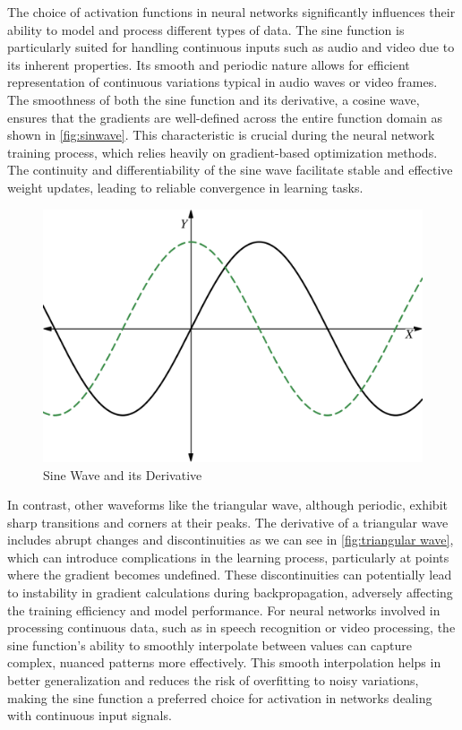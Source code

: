 \documentclass{ioereport}
\begin{document}
    The choice of activation functions in neural networks significantly influences their ability to model and process different types of data. The sine function is particularly suited for handling continuous inputs such as audio and video due to its inherent properties. Its smooth and periodic nature allows for efficient representation of continuous variations typical in audio waves or video frames. The smoothness of both the sine function and its derivative, a cosine wave, ensures that the gradients are well-defined across the entire function domain as shown in \autoref{fig:sinwave}. This characteristic is crucial during the neural network training process, which relies heavily on gradient-based optimization methods. The continuity and differentiability of the sine wave facilitate stable and effective weight updates, leading to reliable convergence in learning tasks.

    \begin{figure}[H]
        \centering
        \includegraphics[height=0.25\textheight]{assets/sine-wave.png}
        \caption{Sine Wave and its Derivative}
        \label{fig:sinwave}
    \end{figure}

    In contrast, other waveforms like the triangular wave, although periodic, exhibit sharp transitions and corners at their peaks. The derivative of a triangular wave includes abrupt changes and discontinuities as we can see in \autoref{fig:triangular wave}, which can introduce complications in the learning process, particularly at points where the gradient becomes undefined. These discontinuities can potentially lead to instability in gradient calculations during backpropagation, adversely affecting the training efficiency and model performance. For neural networks involved in processing continuous data, such as in speech recognition or video processing, the sine function's ability to smoothly interpolate between values can capture complex, nuanced patterns more effectively. This smooth interpolation helps in better generalization and reduces the risk of overfitting to noisy variations, making the sine function a preferred choice for activation in networks dealing with continuous input signals.
    
\end{document}
